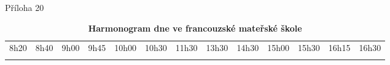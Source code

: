 \begin{landscape}
\begin{table}
\center
Příloha 20\\
	\shorthandoff{-}
	\begin{tabular}{
	|p{10mm}
	|p{10mm}
	|p{23mm}
	|p{8mm}
	|p{15mm}
	|p{27mm}
	|p{18mm} %
	|p{30mm}
	|p{15mm}
	|p{15mm}
	|p{23mm}
	|p{7mm}
	|p{0mm}}
		\multicolumn{1}{l}{\hspace{-5mm}8h20} & 
		\multicolumn{1}{l}{\hspace{-5mm}8h40} &  	%
		\multicolumn{1}{l}{\hspace{-5mm}9h00} &  	%
		\multicolumn{1}{l}{\hspace{-5mm}9h45} & 	%
		\multicolumn{1}{l}{\hspace{-8mm}10h00} & 	%
		\multicolumn{1}{l}{\hspace{-8mm}10h30} &  	%
		\multicolumn{1}{l}{\hspace{-8mm}11h30} &  	%
		\multicolumn{1}{l}{\hspace{-8mm}13h30} &  	%
		\multicolumn{1}{l}{\hspace{-8mm}14h30} &  	%
		\multicolumn{1}{l}{\hspace{-8mm}15h00} & 	%
		\multicolumn{1}{l}{\hspace{-8mm}15h30} &  	%
		\multicolumn{1}{l}{\hspace{-8mm}16h15} &  	%
		\multicolumn{1}{l}{\hspace{-8mm}16h30}  \\ 	%
		\cline{1-6}\cline{8-12}
		 & & & & \cellcolor{gray!50} & & & & &  \cellcolor{gray!50}& & &
		 \multicolumn{1}{l}{} \\ [15mm]
		 \cline{1-6}\cline{8-12}
	\end{tabular}
	\hfill
	\caption{\textbf{Harmonogram dne ve francouzské mateřské škole}}
	\label{tabulkaMS}
\end{table}


\end{landscape}
